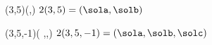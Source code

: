 (3,5)(\sola,\solb)
$2(3,5)=(\sola,\solb)$

(3,5,-1)(%
                       \sola,\solb,\solc)
$2(3,5,-1)=(\sola,\solb,\solc)$
